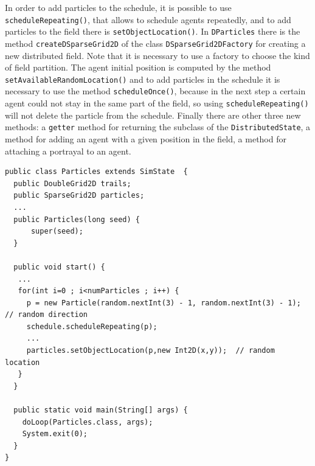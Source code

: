 \documentclass{book}
\begin{document}
In order to add particles to the schedule, it is possible to use \texttt{scheduleRepeating()}, that allows to schedule agents repeatedly, and to add particles to the field there is \texttt{setObjectLocation()}. In \texttt{DParticles} there is the method \texttt{createDSparseGrid2D} of the class \texttt{DSparseGrid2DFactory} for creating a new distributed field. Note that it is necessary to use a factory to choose the kind of field partition. The agent initial position is computed by the method \texttt{setAvailableRandomLocation()} and to add particles in the schedule it is necessary to use the method \texttt{scheduleOnce()}, because in the next step a certain agent could not stay in the same part of the field, so using \texttt{scheduleRepeating()} will not delete the particle from the schedule. Finally there are other three new methods: a \texttt{getter} method for returning the subclass of the \texttt{DistributedState}, a method for adding an agent with a given position in the field, a method for attaching a portrayal to an agent.

\begin{lstlisting}
public class Particles extends SimState  {
  public DoubleGrid2D trails;
  public SparseGrid2D particles;
  ...
  public Particles(long seed) {
      super(seed);
  }
  
  public void start() {
   ...
   for(int i=0 ; i<numParticles ; i++) {
     p = new Particle(random.nextInt(3) - 1, random.nextInt(3) - 1);  // random direction
     schedule.scheduleRepeating(p);
     ...
     particles.setObjectLocation(p,new Int2D(x,y));  // random location
   }
  }
  
  public static void main(String[] args) {
    doLoop(Particles.class, args);
    System.exit(0);
  }
}
\end{lstlisting}
\end{document}
